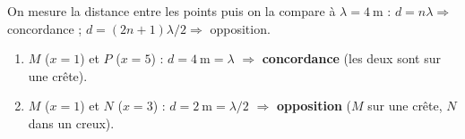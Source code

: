 \documentclass[11pt,a4paper]{article}
\begin{document}
\begin{corrige}
On mesure la distance entre les points puis on la compare à $\lambda=\SI{4}{\metre}$ :
$d=n\lambda\Rightarrow$ concordance ; $d=(2n+1)\lambda/2\Rightarrow$ opposition.
\begin{enumerate}[label=\alph*)]
  \item $M$ ($x=1$) et $P$ ($x=5$) : $d=\SI{4}{\metre}=\lambda$ $\Rightarrow$
        \textbf{concordance} (les deux sont sur une crête).
  \item $M$ ($x=1$) et $N$ ($x=3$) : $d=\SI{2}{\metre}=\lambda/2$ $\Rightarrow$
        \textbf{opposition} ($M$ sur une crête, $N$ dans un creux).
\end{enumerate}
\end{corrige}
\end{document}
